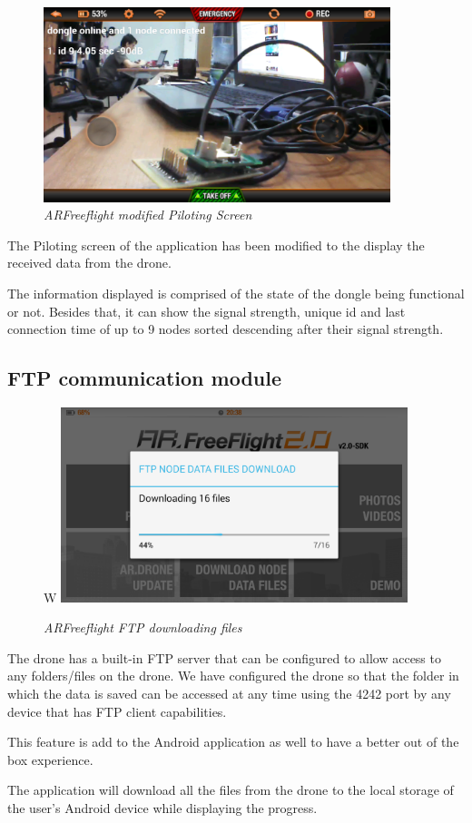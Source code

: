 \begin{figure}[ht]
\begin{center}
\includegraphics[width=0.9\textwidth]{img/android_info.png}
\end{center}
\caption{\small \itshape{ARFreeflight modified Piloting Screen}}
\end{figure}

The Piloting screen of the application has been modified to the display the received data from the drone.

The information displayed is comprised of the state of the dongle being functional or not. Besides that, it can show the signal strength, unique id and last connection time of up to 9 nodes sorted descending after their signal strength.

\subsection{FTP communication module}

\begin{figure}[ht]
\begin{center}W
\includegraphics[width=0.9\textwidth]{img/android_ftp.png}
\end{center}
\caption{\small \itshape{ARFreeflight FTP downloading files}}
\end{figure}

The drone has a built-in FTP server that can be configured to allow access to any folders/files on the drone. We have configured the drone so that the folder in which the data is saved can be accessed at any time using the 4242 port by any device that has FTP client capabilities. 

This feature is add to the Android application as well to have a better out of the box experience.

The application will download all the files from the drone to the local storage of the user's Android device while displaying the progress.

